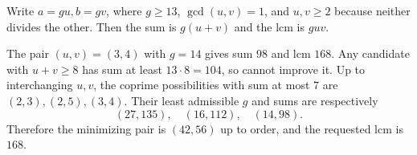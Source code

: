 Write $a=gu,b=gv$, where $g\ge13$, $\gcd(u,v)=1$, and $u,v\ge2$ because neither divides the other. Then the sum is $g(u+v)$ and the lcm is $guv$.

The pair $(u,v)=(3,4)$ with $g=14$ gives sum $98$ and lcm $168$. Any candidate with $u+v\ge8$ has sum at least $13\cdot8=104$, so cannot improve it. Up to interchanging $u,v$, the coprime possibilities with sum at most $7$ are $(2,3),(2,5),(3,4)$. Their least admissible $g$ and sums are respectively
\[
(27,135),\quad(16,112),\quad(14,98).
\]
Therefore the minimizing pair is $(42,56)$ up to order, and the requested lcm is $\boxed{168}$.
